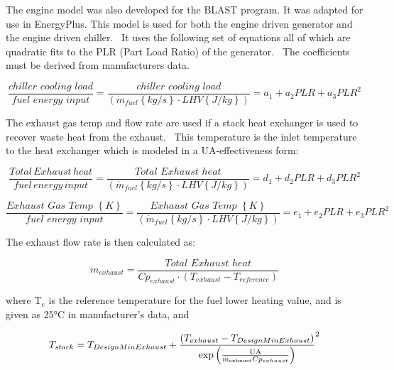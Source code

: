 The engine model was also developed for the BLAST program. It was adapted for use in EnergyPlus. This model is used for both the engine driven generator and the engine driven chiller.~ It uses the following set of equations all of which are quadratic fits to the PLR (Part Load Ratio) of the generator.~ The coefficients must be derived from manufacturers data.

\begin{equation}
\frac{{chiller\,\,cooling\,\,load}}{{fuel\,\,energy\,\,input}} = \frac{{chiller\,\,cooling\,\,load}}{{\left( {{{\dot m}_{fuel}}\left\{ {kg/s} \right\} \cdot LHV\left\{ {J/kg} \right\}} \right)}} = {a_1} + {a_2}PLR + {a_3}PL{R^2}
\end{equation}

The exhaust gas temp and flow rate are used if a stack heat exchanger is used to recover waste heat from the exhaust.~ This temperature is the inlet temperature to the heat exchanger which is modeled in a UA-effectiveness form:

\begin{equation}
\frac{{Total\,Exhaust\,heat}}{{fuel\,energy\,input}} = \frac{{Total\,\,Exhaust\,\,heat}}{{\left( {{{\dot m}_{fuel}}\left\{ {kg/s} \right\} \cdot LHV\left\{ {J/kg} \right\}} \right)}} = {d_1} + {d_2}PLR + {d_3}PL{R^2}
\end{equation}

\begin{equation}
\frac{{Exhaust\,\,Gas\,\,Temp\,\,\left\{ K \right\}}}{{fuel\,\,energy\,\,input}} = \frac{{Exhaust\,\,Gas\,\,Temp\,\,\left\{ K \right\}}}{{\left( {{{\dot m}_{fuel}}\left\{ {kg/s} \right\} \cdot LHV\left\{ {J/kg} \right\}} \right)}} = {e_1} + {e_2}PLR + {e_3}PL{R^2}
\end{equation}

The exhaust flow rate is then calculated as:

\begin{equation}
{\dot m_{exhaust}} = \frac{{Total\,\,Exhaust\,\,heat}}{{C{p_{exhaust}} \cdot \left( {{T_{exhaust}} - {T_{reference}}} \right)}}
\end{equation}

where T\(_{e}\) is the reference temperature for the fuel lower heating value, and is given as 25°C in manufacturer's data, and

\begin{equation}
{T_{stack}} = {T_{DesignMinExhaust}} + {\frac{{\left( {{T_{exhaust}} - {T_{DesignMinExhaust}}} \right)}}{{{\rm{exp}}\left( {\frac{{{\rm{UA}}}}{{{{{\rm{\dot m}}}_{{\rm{exhaust}}}}C{p_{exhaust}}}}} \right)}}^2}
\end{equation}

